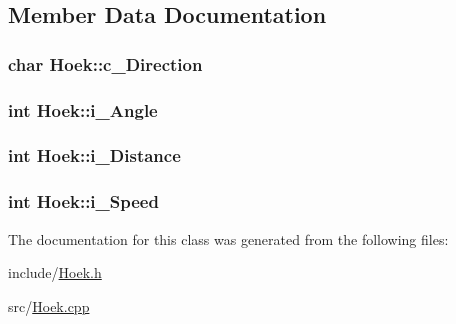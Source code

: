 \subsection{Member Data Documentation}
\hypertarget{classHoek_a0ab8c37c98a7e3ed6d5b74013e9946ca}{
\subsubsection[{c\-\_\-\-Direction}]{\setlength{\rightskip}{0pt plus 5cm}char Hoek\-::c\-\_\-\-Direction\hspace{0.3cm}{\ttfamily [private]}}}\label{classHoek_a0ab8c37c98a7e3ed6d5b74013e9946ca}
\hypertarget{classHoek_a7a64714ad3c3323e0db2a4efd254c6a2}{
\subsubsection[{i\-\_\-\-Angle}]{\setlength{\rightskip}{0pt plus 5cm}int Hoek\-::i\-\_\-\-Angle\hspace{0.3cm}{\ttfamily [private]}}}\label{classHoek_a7a64714ad3c3323e0db2a4efd254c6a2}
\hypertarget{classHoek_a007485bd11353762cc5f70f299729244}{
\subsubsection[{i\-\_\-\-Distance}]{\setlength{\rightskip}{0pt plus 5cm}int Hoek\-::i\-\_\-\-Distance\hspace{0.3cm}{\ttfamily [private]}}}\label{classHoek_a007485bd11353762cc5f70f299729244}
\hypertarget{classHoek_ad83215305ee0c803a4eedae37610cd9e}{
\subsubsection[{i\-\_\-\-Speed}]{\setlength{\rightskip}{0pt plus 5cm}int Hoek\-::i\-\_\-\-Speed\hspace{0.3cm}{\ttfamily [private]}}}\label{classHoek_ad83215305ee0c803a4eedae37610cd9e}


The documentation for this class was generated from the following files\-:\begin{DoxyCompactItemize}
\item 
include/\hyperlink{Hoek_8h}{Hoek.\-h}\item 
src/\hyperlink{Hoek_8cpp}{Hoek.\-cpp}\end{DoxyCompactItemize}
